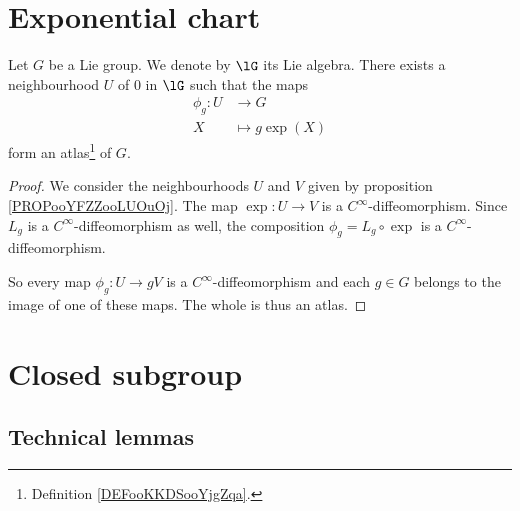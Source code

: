 

\section{Exponential chart}

\begin{proposition}	\label{PROPooVMLTooFpXoeh}
	Let \( G\) be a Lie group. We denote by \( \lG\) its Lie algebra. There exists a neighbourhood \( U\) of \( 0\) in \( \lG\) such that the maps
	\begin{equation}
		\begin{aligned}
			\phi_g\colon U & \to G            \\
			X              & \mapsto g\exp(X)
		\end{aligned}
	\end{equation}
	form an atlas\footnote{Definition \ref{DEFooKKDSooYjgZqa}.} of \( G\).
\end{proposition}

\begin{proof}
	We consider the neighbourhoods \( U\) and \( V\) given by proposition \ref{PROPooYFZZooLUOuOj}. The map \(\exp \colon U\to V  \) is a \( C^{\infty}\)-diffeomorphism. Since \( L_g\) is a \( C^{\infty}\)-diffeomorphism as well, the composition \( \phi_g=L_g\circ\exp\) is a \( C^{\infty}\)-diffeomorphism.

	So every map \(\phi_g \colon U\to gV  \) is a \( C^{\infty}\)-diffeomorphism and each \( g\in G\) belongs to the image of one of these maps. The whole is thus an atlas.
\end{proof}

\section{Closed subgroup}

\subsection{Technical lemmas}


